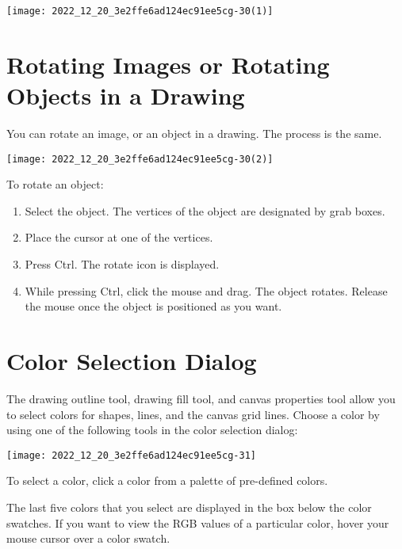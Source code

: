 \begin{center}
\texttt{[image: 2022\_12\_20\_3e2ffe6ad124ec91ee5cg-30(1)]}
\end{center}

\section{Rotating Images or Rotating Objects in a Drawing}
You can rotate an image, or an object in a drawing. The process is the same.

\begin{center}
\texttt{[image: 2022\_12\_20\_3e2ffe6ad124ec91ee5cg-30(2)]}
\end{center}

To rotate an object:

\begin{enumerate}
  \item Select the object. The vertices of the object are designated by grab boxes.

  \item Place the cursor at one of the vertices.

  \item Press Ctrl. The rotate icon is displayed.

  \item While pressing Ctrl, click the mouse and drag. The object rotates. Release the mouse once the object is positioned as you want.

\end{enumerate}

\section{Color Selection Dialog}
The drawing outline tool, drawing fill tool, and canvas properties tool allow you to select colors for shapes, lines, and the canvas grid lines. Choose a color by using one of the following tools in the color selection dialog:

\begin{center}
\texttt{[image: 2022\_12\_20\_3e2ffe6ad124ec91ee5cg-31]}
\end{center}

To select a color, click a color from a palette of pre-defined colors.

The last five colors that you select are displayed in the box below the color swatches. If you want to view the RGB values of a particular color, hover your mouse cursor over a color swatch.


